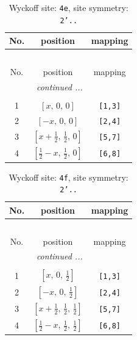 \documentclass[fleqn,8pt]{jsarticle}
\begin{document}
\begin{longtable}{ccc}
\caption{Wyckoff site: {\tt 4e}, site symmetry: {\tt 2'..}}
 \\
 \hline \hline
No. & position & mapping \\ \hline \endfirsthead

\multicolumn{2}{l}{\tablename\ \thetable{}} \\
 \hline \hline
No. & position & mapping \\ \hline \endhead

 \hline \hline
\multicolumn{2}{r}{\footnotesize\it continued ...} \\ \endfoot

 \hline \hline
\multicolumn{2}{r}{} \\ \endlastfoot

1 & $\left[ x,\, 0,\, 0 \right]$ & {\tt [1,3]} \\ \hline
2 & $\left[ - x,\, 0,\, 0 \right]$ & {\tt [2,4]} \\ \hline
3 & $\left[ x + \frac{1}{2},\, \frac{1}{2},\, 0 \right]$ & {\tt [5,7]} \\ \hline
4 & $\left[ \frac{1}{2} - x,\, \frac{1}{2},\, 0 \right]$ & {\tt [6,8]} \\
\end{longtable}
\renewcommand{\arraystretch}{1.2}
\begin{longtable}{ccc}
\caption{Wyckoff site: {\tt 4f}, site symmetry: {\tt 2'..}}
 \\
 \hline \hline
No. & position & mapping \\ \hline \endfirsthead

\multicolumn{2}{l}{\tablename\ \thetable{}} \\
 \hline \hline
No. & position & mapping \\ \hline \endhead

 \hline \hline
\multicolumn{2}{r}{\footnotesize\it continued ...} \\ \endfoot

 \hline \hline
\multicolumn{2}{r}{} \\ \endlastfoot

1 & $\left[ x,\, 0,\, \frac{1}{2} \right]$ & {\tt [1,3]} \\ \hline
2 & $\left[ - x,\, 0,\, \frac{1}{2} \right]$ & {\tt [2,4]} \\ \hline
3 & $\left[ x + \frac{1}{2},\, \frac{1}{2},\, \frac{1}{2} \right]$ & {\tt [5,7]} \\ \hline
4 & $\left[ \frac{1}{2} - x,\, \frac{1}{2},\, \frac{1}{2} \right]$ & {\tt [6,8]} \\
\end{longtable}
\end{document}
